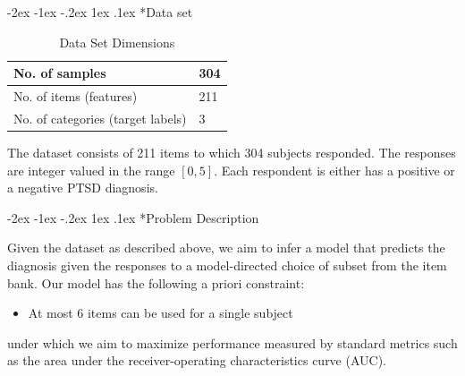 \documentclass[twocolumn,,9pt]{IEEEtran}
\makeatletter
\renewcommand\section{\@startsection {section}{1}{\z@}%
  {-2ex \@plus -1ex \@minus -.2ex}%
  {1ex \@plus.1ex}%
  {\large\bfseries\scshape}}
\renewcommand{\captionN}[1]{\caption{\color{CadetBlue4!80!black} \sffamily \fontsize{8}{9}\selectfont #1  }}
\makeatother
\begin{document}
 
% 
% 
\vspace{-10pt}   


\section*{Data set}

\begin{table}[!ht]
  \centering
  \captionN{Data Set Dimensions}\label{tab0}
  \begin{tabular}{|L{1.5in}|L{.3in}|}\hline
    No. of samples & 304 \\\hline
    No. of items (features) & 211 \\\hline
    No. of categories (target labels) & 3 \\\hline
  \end{tabular}
\end{table}

The dataset consists of 211 items to which 304
subjects responded. The responses are integer valued in the range $[0,5]$.
  Each respondent is either has a positive or a negative
  PTSD diagnosis.

\section*{Problem Description}

Given the dataset as described above, we aim to infer a
model that predicts the diagnosis given the responses
to a model-directed choice of subset from the  item bank.
Our model has the following a priori constraint:
\begin{itemize}
\item At most $6$ items can be used for a single subject
\end{itemize}
under which we aim to maximize performance measured by standard
metrics such as the area under the receiver-operating characteristics curve (AUC).
\end{document}
